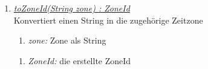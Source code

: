 \begin{enumerate}[+]
\item \underline{\textit{toZoneId(String zone) : ZoneId}}\\
Konvertiert einen String in die zugehörige Zeitzone

\begin{enumerate}[$\bullet$]
\item \textit{zone:} Zone als String
\end{enumerate}
\vspace{-0.2cm}
\begin{enumerate}[$\circ$]
\item \textit{ZoneId:} die erstellte ZoneId
\end{enumerate}

\end{enumerate}